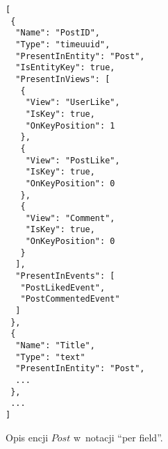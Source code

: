 \begin{figure}[!ht]
\begin{verbatim}
[
 {
  "Name": "PostID",
  "Type": "timeuuid",
  "PresentInEntity": "Post",
  "IsEntityKey": true,
  "PresentInViews": [
   {
    "View": "UserLike",
    "IsKey": true,
    "OnKeyPosition": 1
   },
   {
    "View": "PostLike",
    "IsKey": true,
    "OnKeyPosition": 0
   },
   {
    "View": "Comment",
    "IsKey": true,
    "OnKeyPosition": 0
   }
  ],
  "PresentInEvents": [
   "PostLikedEvent",
   "PostCommentedEvent"
  ]
 },
 {
  "Name": "Title",
  "Type": "text"
  "PresentInEntity": "Post",
  ...
 },
 ...
]
\end{verbatim}
\caption{Opis encji $Post$ w~notacji ``per field''.}
\label{fig:single:model_perField}
\end{figure}
